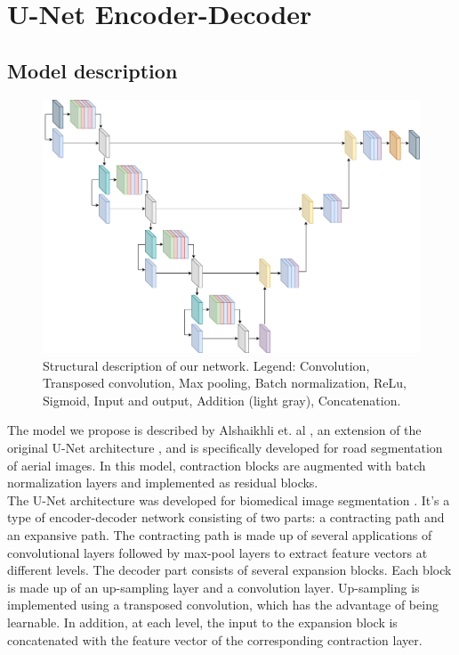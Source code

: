 \documentclass[10pt,conference,compsocconf]{IEEEtran}
\begin{document}
\section{U-Net Encoder-Decoder}

\subsection{Model description}

\begin{figure}
    \centering
    \includegraphics[width = 0.9 \textwidth, height = 0.4 \textheight]{doc/images/Unet.png}
    \caption{Structural description of our network. Legend: 
    \textcolor{conv}{Convolution},
    \textcolor{convtransp}{Transposed convolution},
    \textcolor{maxpool}{Max pooling},
    \textcolor{batchnorm}{Batch normalization},
    \textcolor{relu}{ReLu}, \textcolor{sigmoid}{Sigmoid},
    \textcolor{io}{Input and output}, \textcolor{add}{Addition} (light gray), \textcolor{concat}{Concatenation}.}
    \label{fig:model_arch}
\end{figure}

The model we propose is described by Alshaikhli et. al \cite{unet_roadseg}, an extension of the original U-Net architecture \cite{unet_medical}, and is specifically developed for road segmentation of aerial images. In this model, contraction blocks are augmented with batch normalization layers and implemented as residual blocks.  \\

The U-Net architecture was developed for biomedical image segmentation \cite{unet_medical}. It's a type of encoder-decoder network consisting of two parts: a contracting path and an expansive path. The contracting path is made up of several applications of convolutional layers followed by max-pool layers to extract feature vectors at different levels. The decoder part consists of several expansion blocks. Each block is made up of an up-sampling layer and a convolution layer. Up-sampling is implemented using a transposed convolution, which has the advantage of being learnable. In addition, at each level, the input to the expansion block is concatenated with the feature vector of the corresponding contraction layer. \\
\end{document}
